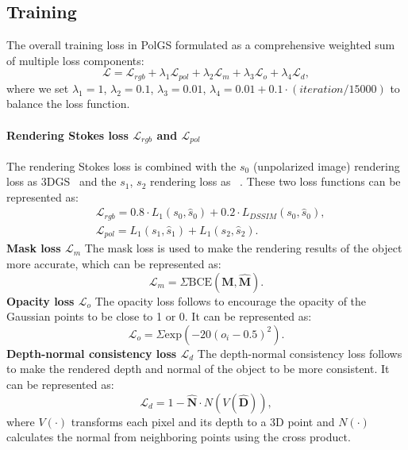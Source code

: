 \subsection{Training}
The overall training loss in PolGS formulated as a comprehensive weighted sum of multiple loss components:
\begin{equation}
	\mathcal{L} = \mathcal{L}_{rgb}+\lambda_{1}\mathcal{L}_{pol}+\lambda_{2}\mathcal{L}_{m}+\lambda_{3}\mathcal{L}_{o}	+\lambda_{4}\mathcal{L}_{d},
\end{equation}
where we set $\lambda_{1}=1$, $\lambda_{2}=0.1$, $\lambda_{3}=0.01$, 
$\lambda_{4}=0.01+0.1\cdot (iteration/15000)$ to balance the loss function.
\vspace{-1em}
\paragraph{Rendering Stokes loss $\mathcal{L}_{rgb}$ and $\mathcal{L}_{pol}$}
The rendering Stokes loss is combined with the $s_0$ (unpolarized image) rendering loss as 3DGS~\cite{kerbl20233d} and the 
$s_1$, $s_2$ rendering loss as \pandora~\cite{baek2018simultaneous}. These two loss functions can be represented as:
\begin{align}
        &\mathcal{L}_{rgb} = 0.8\cdot L_{1} (s_0,\hat{s}_0)+0.2\cdot L_{DSSIM}(s_0,\hat{s}_0),\\
        &\mathcal{L}_{pol} =L_{1} (s_1,\hat{s}_1)+L_{1} (s_2,\hat{s}_2).
\end{align}
\textbf{Mask loss $\mathcal{L}_{m}$}\quad
The mask loss is used to make the rendering results of the object more accurate, which can be represented as:
\begin{equation}
    \mathcal{L}_{m} = \Sigma\text{BCE}(\textbf{M},\hat{\textbf{M}}).
\end{equation}
\textbf{Opacity loss $\mathcal{L}_{o}$}\quad
The opacity loss follows \gs to encourage the opacity of the Gaussian points to be close to 1 or 0. It can be represented as:
\begin{equation}
    \mathcal{L}_{o} = \Sigma\text{exp}(-{20(o_i-0.5)}^2).
\end{equation}
\textbf{Depth-normal consistency loss $\mathcal{L}_{d}$}\quad
The depth-normal consistency loss follows \gs to make the rendered depth and normal of the object to be more consistent.
It can be represented as:
\begin{equation}
    \mathcal{L}_{d} = 1-\hat{\textbf{N}}\cdot N(V(\hat{\textbf{D}})),
\end{equation}
where $V(\cdot)$ transforms each pixel and its depth to a 3D point and $N(\cdot)$ calculates the normal from neighboring points using the cross product.


